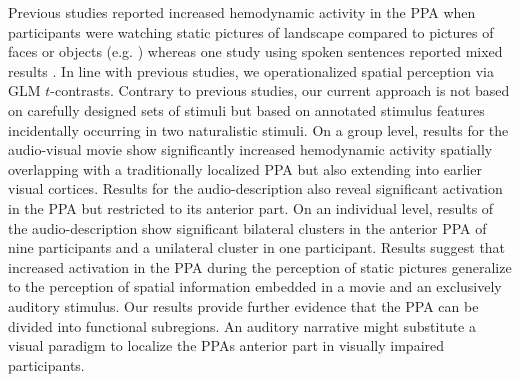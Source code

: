 \documentclass[english]{article}
\begin{document}
Previous studies reported increased hemodynamic activity in the PPA when
participants were watching static pictures of landscape compared to pictures of
faces or objects (e.g. \citep{epstein1998ppa, epstein1999parahippocampal})
whereas one study using spoken sentences reported mixed results
\citep{aziz2008modulation}.
In line with previous studies, we operationalized spatial perception via GLM $t$-contrasts.
Contrary to previous studies, our current approach is not based on carefully
designed sets of stimuli but based on annotated stimulus features incidentally
occurring in two naturalistic stimuli.
On a group level, results for the audio-visual movie show
significantly increased hemodynamic activity spatially overlapping with a
traditionally localized PPA but also extending into earlier visual cortices.
Results for the audio-description also reveal significant activation in the PPA
but restricted to its anterior part.
On an individual level, results of the audio-description show significant
bilateral clusters in the anterior PPA of nine participants and a unilateral cluster
in one participant.
Results suggest that increased activation in the PPA during the perception of
static pictures generalize to the perception of spatial information embedded in
a movie and an exclusively auditory stimulus.
Our results provide further evidence that the PPA can be divided into functional
subregions.
An auditory narrative might substitute a visual paradigm to localize the PPAs
anterior part in visually impaired participants.
\end{document}
